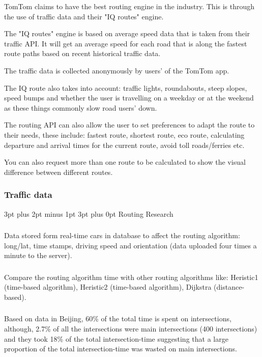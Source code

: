 \documentclass[12pt,a4paper]{article}
\makeatletter
\renewcommand\subsection{\@startsection {subsection}{1}{2mm} %
                               {3pt plus 2pt minus 1pt} %
                               {3pt plus 0pt} %
                               {\normalfont\bfseries}}
\makeatother
\begin{document}
TomTom claims to have the best routing engine in the industry. This is through the use of traffic data and their "IQ routes" engine.

The "IQ routes" engine is based on average speed data that is taken from their traffic API. It will get an average speed for each road that is along the fastest route paths based on recent historical traffic data. 

The traffic data is collected anonymously by users' of the TomTom app. 

The IQ route also takes into account: traffic lights, roundabouts, steep slopes, speed bumps and whether the user is travelling on a weekday or at the weekend as these things commonly slow road users' down.

The routing API can also allow the user to set preferences to adapt the route to their needs, these include: fastest route, shortest route, eco route, calculating departure and arrival times for the current route, avoid toll roads/ferries etc.  

You can also request more than one route to be calculated to show the visual difference between different routes. 
\subsubsection{Traffic data}

\subsection{Routing Research}

\subsubsection{}
Data stored form real-time cars in database to affect the routing algorithm: long/lat, time stamps, driving speed and orientation (data uploaded four times a minute to the server). \cite{Zheng2018}

\subsubsection{}
Compare the routing algorithm time with other routing algorithms like: Heristic1 (time-based algorithm), Heristic2 (time-based algorithm), Dijkstra (distance-based). \cite{Zheng2018}

\subsubsection{}
Based on data in Beijing, 60\% of the total time is spent on intersections, although, 2.7\% of all the intersections were main intersections (400 intersections) and they took 18\% of the total intersection-time suggesting that a large proportion of the total intersection-time was wasted on main intersections. \cite{Liu}
\end{document}
